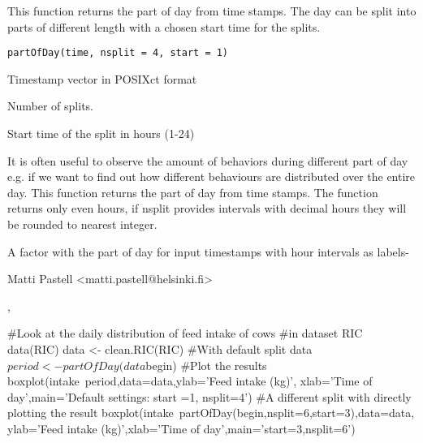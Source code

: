 \begin{Description}\relax
This function returns the part of day
from time stamps. The day can be split into parts of different length
with a chosen start time for the splits.
\end{Description}
\begin{Usage}
\begin{verbatim}
partOfDay(time, nsplit = 4, start = 1)
\end{verbatim}
\end{Usage}
\begin{Arguments}
\begin{ldescription}
\item[\code{time}] Timestamp vector in POSIXct format
\item[\code{nsplit}] Number of splits.
\item[\code{start}] Start time of the split in hours (1-24)
\end{ldescription}
\end{Arguments}
\begin{Details}\relax
It is often useful to observe the amount of behaviors during different
part of day e.g. if we want to find out how different behaviours are
distributed over the entire day. This function returns the part of day
from time stamps. The function returns only even hours, if nsplit
provides intervals with decimal hours they will be rounded to
nearest integer.
\end{Details}
\begin{Value}
A factor with the part of day for input timestamps with hour intervals
as labels-
\end{Value}
\begin{Author}\relax
Matti Pastell <matti.pastell@helsinki.fi>
\end{Author}
\begin{SeeAlso}\relax
{}, 
\end{SeeAlso}
\begin{Examples}
\begin{ExampleCode}
#Look at the daily distribution of feed intake of cows
#in dataset RIC
data(RIC)
data <- clean.RIC(RIC)
#With default split
data$period <- partOfDay(data$begin)
#Plot the results
boxplot(intake~period,data=data,ylab='Feed intake (kg)',
xlab='Time of day',main='Default settings: start =1, nsplit=4')
#A different split with directly plotting the result
boxplot(intake~partOfDay(begin,nsplit=6,start=3),data=data,
ylab='Feed intake (kg)',xlab='Time of day',main='start=3,nsplit=6')
\end{ExampleCode}
\end{Examples}

